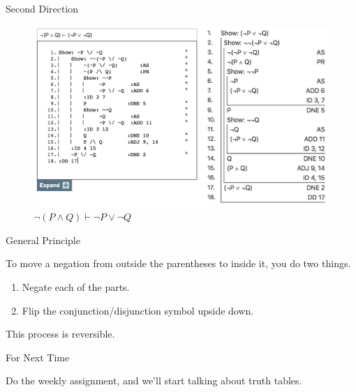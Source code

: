 \documentclass[
  ignorenonframetext,
]{beamer}
\providecommand{\tightlist}{%
  \setlength{\itemsep}{0pt}\setlength{\parskip}{0pt}}
\renewcommand{\,}{\text{, }}
\begin{document}
\begin{frame}{Second Direction}
\protect\hypertarget{second-direction-1}{}

\begin{figure}
\centering
\includegraphics{../images/class05/Class-05-10.png}
\caption{\(\neg (P \wedge Q) \vdash \neg P \vee \neg Q\)}
\end{figure}

\end{frame}

\begin{frame}{General Principle}
\protect\hypertarget{general-principle}{}

To move a negation from outside the parentheses to inside it, you do two
things.

\begin{enumerate}
\tightlist
\item
  Negate each of the parts.
\item
  Flip the conjunction/disjunction symbol upside down.
\end{enumerate}

This process is reversible.

\end{frame}

\begin{frame}{For Next Time}
\protect\hypertarget{for-next-time}{}

Do the weekly assignment, and we'll start talking about truth tables.

\end{frame}
\end{document}
